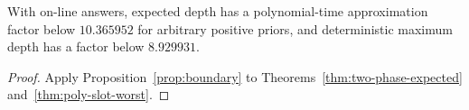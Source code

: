 \begin{corollary}
\label{cor:constant-boundaries}
With on-line answers, expected depth has a polynomial-time
approximation factor below $10.365952$ for arbitrary positive priors,
and deterministic maximum depth has a factor below $8.929931$.
\end{corollary}
\begin{proof}
Apply Proposition~\ref{prop:boundary} to
Theorems~\ref{thm:two-phase-expected} and~\ref{thm:poly-slot-worst}.
\end{proof}
